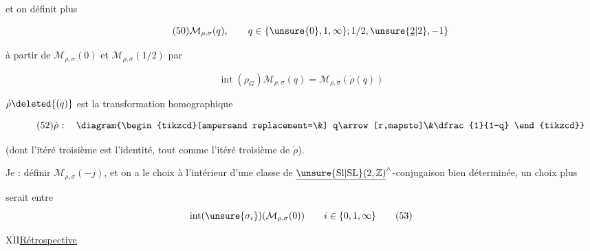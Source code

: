et on définit plus 

\begin{equation*}
\tag{50}
\mathcal M_{\rho,\sigma}(q),\qquad
q\in\{\unsure{0},1,\infty\};1/2,\unsure{\underline 2|2},-1\}
\end{equation*}

à partir de $\mathcal M_{\rho,\sigma}(0)$ et
$\mathcal M_{\rho,\sigma}(1/2)$ par

\begin{equation*}
\tag{51}
\operatorname{int}(\rho_G)\mathcal M_{\rho,\sigma}(q)
=\mathcal M_{\rho,\sigma}(\dot\rho(q))
\end{equation*}


$\dot\rho\deleted{(q)}$ est la transformation homographique

\begin{equation*}
\tag{52}
\dot\rho:\quad
\diagram{\begin{tikzcd}[ampersand replacement=\&]
q\arrow[r,mapsto]\&\dfrac{1}{1-q}
\end{tikzcd}}
\end{equation*}

(dont l'itéré troisième est l'identité, tout comme l'itéré troisième
de $\widetilde\rho$).

Je  : définir $\mathcal M_{\rho,\sigma}(-j)$, et
 on a le choix à l'intérieur d'une classe de
$\underline{\unsure{\mathrm{Sl}|\mathrm{SL}}(2,\mathbb Z)}^{\wedge}$-conjugaison bien déterminée,
un choix plus


 serait entre
\[
\operatorname{int}(\unsure{\sigma_i})(\mathcal M_{\rho,\sigma}(0))
\qquad i\in\{0,1,\infty\}
\tag{53}
\]

\uline{$\overline{\mathrm{XII}}$}\qquad\uline{Rétrospective}

